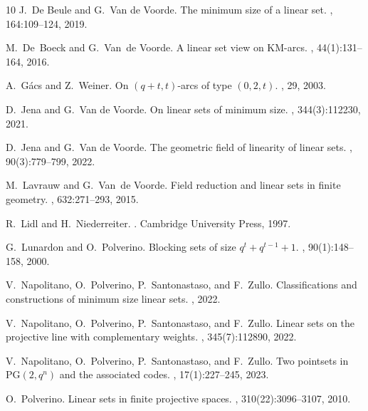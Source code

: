 \documentclass[11pt]{article}
\theoremstyle{definition}
\begin{document}
\begin{thebibliography}{10}
J.~{De Beule} and G.~{Van de Voorde}.
\newblock The minimum size of a linear set.
, 164:109--124, 2019.

M.~De~Boeck and G.~Van~de Voorde.
\newblock A linear set view on {KM}-arcs.
, 44(1):131--164, 2016.

A.~Gács and Z.~Weiner.
\newblock On $(q + t, t)$-arcs of type $(0, 2, t)$.
, 29, 2003.

D.~Jena and G.~{Van de Voorde}.
\newblock On linear sets of minimum size.
, 344(3):112230, 2021.

D.~Jena and G.~{Van de Voorde}.
\newblock The geometric field of linearity of linear sets.
, 90(3):779--799, 2022.

M.~Lavrauw and G.~Van~de Voorde.
\newblock Field reduction and linear sets in finite geometry.
, 632:271--293, 2015.

R.~Lidl and H.~Niederreiter.
.
\newblock Cambridge University Press, 1997.

G.~Lunardon and O.~Polverino.
\newblock Blocking sets of size $q^t+q^{t-1}+1$.
, 90(1):148--158,
  2000.

V.~Napolitano, O.~Polverino, P.~Santonastaso, and F.~Zullo.
\newblock Classifications and constructions of minimum size linear sets.
, 2022.

V.~Napolitano, O.~Polverino, P.~Santonastaso, and F.~Zullo.
\newblock Linear sets on the projective line with complementary weights.
, 345(7):112890, 2022.

V.~Napolitano, O.~Polverino, P.~Santonastaso, and F.~Zullo.
\newblock Two pointsets in $ \mathrm{PG}(2,q^n) $ and the associated codes.
, 17(1):227--245,
  2023.

O.~Polverino.
\newblock Linear sets in finite projective spaces.
, 310(22):3096--3107, 2010.


\end{thebibliography}
\end{document}
